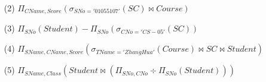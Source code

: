 \documentclass[UTF8]{ctexart}
\begin{document}
\begin{itemize}
\begin{enumerate}
\begin{enumerate}
			\item[(2)] $\Pi_{CName, Score}(\sigma_{SNo='01055107'}(SC) \bowtie Course)$
			
			\item[(3)] $\Pi_{SNo}(Student) - \Pi_{SNo}(\sigma_{CNo='CS-05'}(SC))$
			
			\item[(4)] $\Pi_{SName, CName, Score}(\sigma_{TName='ZhangHua'}(Course) \bowtie SC \bowtie Student)$
			
			\item[(5)] $\Pi_{SName, Class}(Student \bowtie (\Pi_{SNo, CNo} \div \Pi_{SNo}(Student)))$
		\end{enumerate}
	\end{enumerate}
\end{itemize}
\end{document}
